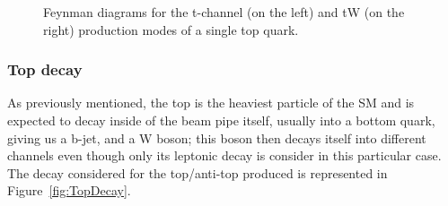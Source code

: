 \documentclass[a4paper, 10pt, openright]{report}
\begin{document}
\begin{figure}[htbp]
\centering
\begin{minipage}[b]{.34\textwidth}
\end{minipage} 
\begin{minipage}[b]{.34\textwidth}
\end{minipage} 
\caption{Feynman diagrams for the t-channel (on the left) and tW (on the right) production modes of a single top quark.}
\label{fig:singleTopOtherChann}
\end{figure}

\subsubsection{Top decay} \label{subsection:topDecay}

As previously mentioned, the top is the heaviest particle of the \ac{SM} and is expected to decay inside of the beam pipe itself, usually into a bottom quark, giving us a b-jet, and a W boson; this boson then decays itself into different channels even though only its leptonic decay is consider in this particular case. The decay considered for the top/anti-top produced is represented in Figure~\ref{fig:TopDecay}.
\end{document}
